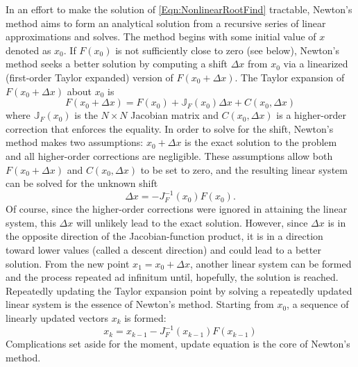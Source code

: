 \documentclass[Prelim,12pt]{WisconsinThesis}
\newcommand{\by}    {\!\times\!}
\begin{document}
In an effort to make the solution of \cref{Eqn:NonlinearRootFind} tractable, Newton's method aims to form an analytical solution from a recursive series of linear approximations and solves.
The method begins with some initial value of $x$ denoted as $x_0$.
If $F(x_0)$ is not sufficiently close to zero (see below), Newton's method seeks a better solution by computing a shift $\Delta{x}$ from $x_0$ via a linearized (first-order Taylor expanded) version of $F(x_0 + \Delta{x})$.
The Taylor expansion of $F(x_0 + \Delta{x})$ about $x_0$ is
\begin{equation}
    F(x_0 + \Delta{x}) =  F(x_0) + \mathbb{J}_{F}(x_0)\Delta{x} + C(x_0,\Delta{x})
\end{equation}
where $\mathbb{J}_{F}(x_0)$ is the $N \by N$ Jacobian matrix and $C(x_0,\Delta{x})$ is a higher-order correction that enforces the equality.
In order to solve for the shift, Newton's method makes two assumptions: $x_0 + \Delta{x}$ is the exact solution to the problem and all higher-order corrections are negligible.
These assumptions allow both $F(x_0 + \Delta{x})$ and $C(x_0,\Delta{x})$ to be set to zero, and the resulting linear system can be solved for the unknown shift
\begin{equation}
    \Delta{x} = - J_{F}^{-1}(x_0) F(x_0).
\end{equation}
Of course, since the higher-order corrections were ignored in attaining the linear system, this $\Delta{x}$ will unlikely lead to the exact solution.
However, since $\Delta{x}$ is in the opposite direction of the Jacobian-function product, it is in a direction toward lower values (called a descent direction) and could lead to a better solution.
From the new point $x_1 = x_0 + \Delta{x}$, another linear system can be formed and the process repeated ad infinitum until, hopefully, the solution is reached.
Repeatedly updating the Taylor expansion point by solving a repeatedly updated linear system is the essence of Newton's method.
Starting from $x_0$, a sequence of linearly updated vectors $x_k$ is formed:
\begin{equation}
    x_k = x_{k-1} - J_{F}^{-1}(x_{k-1}) F(x_{k-1})
\end{equation}
Complications set aside for the moment, update equation is the core of Newton's method.
\end{document}
